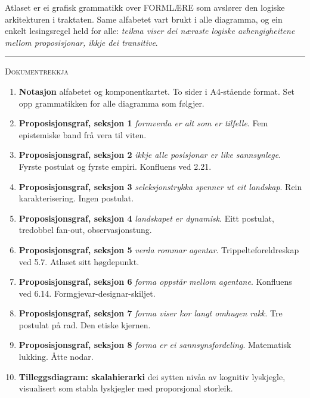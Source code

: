 \documentclass[a4paper,11pt]{article}
\begin{document}
Atlaset er ei grafisk grammatikk over FORMLÆRE som avslører den logiske arkitekturen i traktaten. Same alfabetet vart brukt i alle diagramma, og ein enkelt lesingsregel held for alle: \emph{teikna viser dei næraste logiske avhengigheitene mellom proposisjonar, ikkje dei transitive}.

\vspace{0.5em}

\hrule

\vspace{0.5em}

{\scshape Dokumentrekkja}

\begin{enumerate}[leftmargin=*,itemsep=0.15em]
\item \textbf{Notasjon}  alfabetet og komponentkartet. To sider i A4-stående format. Set opp grammatikken for alle diagramma som følgjer.
\item \textbf{Proposisjonsgraf, seksjon 1}  \emph{formverda er alt som er tilfelle}. Fem epistemiske band frå vera til viten.
\item \textbf{Proposisjonsgraf, seksjon 2}  \emph{ikkje alle posisjonar er like sannsynlege}. Fyrste postulat og fyrste empiri. Konfluens ved 2.21.
\item \textbf{Proposisjonsgraf, seksjon 3}  \emph{seleksjonstrykka spenner ut eit landskap}. Rein karakterisering. Ingen postulat.
\item \textbf{Proposisjonsgraf, seksjon 4}  \emph{landskapet er dynamisk}. Eitt postulat, tredobbel fan-out, observasjonstung.
\item \textbf{Proposisjonsgraf, seksjon 5}  \emph{verda rommar agentar}. Trippelteforeldreskap ved 5.7. Atlaset sitt høgdepunkt.
\item \textbf{Proposisjonsgraf, seksjon 6}  \emph{forma oppstår mellom agentane}. Konfluens ved 6.14. Formgjevar-designar-skiljet.
\item \textbf{Proposisjonsgraf, seksjon 7}  \emph{forma viser kor langt omhugen rakk}. Tre postulat på rad. Den etiske kjernen.
\item \textbf{Proposisjonsgraf, seksjon 8}  \emph{forma er ei sannsynsfordeling}. Matematisk lukking. Åtte nodar.
\item \textbf{Tilleggsdiagram: skalahierarki}  dei sytten nivåa av kognitiv lyskjegle, visualisert som stabla lyskjegler med proporsjonal storleik.
\end{enumerate}

\vspace{1em}
\end{document}
